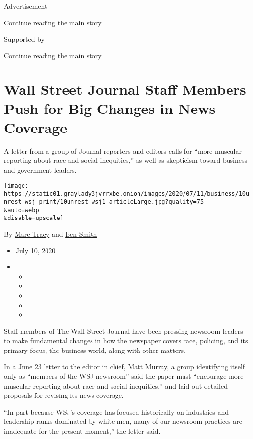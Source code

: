 Advertisement

\protect\hyperlink{after-top}{Continue reading the main story}

Supported by

\protect\hyperlink{after-sponsor}{Continue reading the main story}

\hypertarget{wall-street-journal-staff-members-push-for-big-changes-in-news-coverage}{%
\section{Wall Street Journal Staff Members Push for Big Changes in News
Coverage}\label{wall-street-journal-staff-members-push-for-big-changes-in-news-coverage}}

A letter from a group of Journal reporters and editors calls for ``more
muscular reporting about race and social inequities,'' as well as
skepticism toward business and government leaders.

\texttt{[image: https://static01.graylady3jvrrxbe.onion/images/2020/07/11/business/10unrest-wsj-print/10unrest-wsj1-articleLarge.jpg?quality=75\\\&auto=webp\\\&disable=upscale]}

By \href{https://www.nytimes3xbfgragh.onion/by/marc-tracy}{Marc Tracy}
and \href{https://www.nytimes3xbfgragh.onion/by/ben-smith}{Ben Smith}

\begin{itemize}
\item
  July 10, 2020
\item
  \begin{itemize}
  \item
  \item
  \item
  \item
  \item
  \end{itemize}
\end{itemize}

Staff members of The Wall Street Journal have been pressing newsroom
leaders to make fundamental changes in how the newspaper covers race,
policing, and its primary focus, the business world, along with other
matters.

In a June 23 letter to the editor in chief, Matt Murray, a group
identifying itself only as ``members of the WSJ newsroom'' said the
paper must ``encourage more muscular reporting about race and social
inequities,'' and laid out detailed proposals for revising its news
coverage.

``In part because WSJ's coverage has focused historically on industries
and leadership ranks dominated by white men, many of our newsroom
practices are inadequate for the present moment,'' the letter said.

